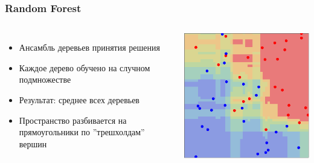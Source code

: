 \documentclass{beamer}
\begin{document}
\begin{frame} \frametitle{Random Forest}
    \begin{columns}
            \begin{itemize}
                \item Ансамбль деревьев принятия решения
                \item Каждое дерево обучено на случном подмножестве
                \item Результат: среднее всех деревьев 
                \item Пространство разбивается на прямоугольники по ''трешхолдам'' вершин
            \end{itemize}
        \includegraphics[width=\textwidth]{random_forest.png}
    \end{columns}
\end{frame}
\end{document}
